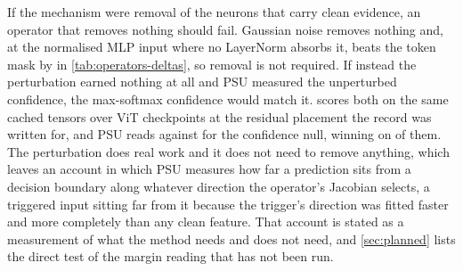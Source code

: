 \documentclass[../main.tex]{subfiles}
\begin{document}
If the mechanism were removal of the neurons that carry clean evidence, an operator that removes nothing should fail. Gaussian noise removes nothing and, at the normalised MLP input where no LayerNorm absorbs it, beats the token mask by \GaussianMinusTokenMaskMlp{} in \cref{tab:operators-deltas}, so removal is not required. If instead the perturbation earned nothing at all and PSU measured the unperturbed confidence, the max-softmax confidence would match it.  scores both on the same cached tensors over \ConfidenceNullCheckpoints{} ViT checkpoints at the residual placement the record was written for, and PSU reads \ConfidenceNullPsuAuroc{} against \ConfidenceNullAuroc{} for the confidence null, winning on \ConfidenceNullPsuWins{} of them. The perturbation does real work and it does not need to remove anything, which leaves an account in which PSU measures how far a prediction sits from a decision boundary along whatever direction the operator's Jacobian selects, a triggered input sitting far from it because the trigger's direction was fitted faster and more completely than any clean feature. That account is stated as a measurement of what the method needs and does not need, and \cref{sec:planned} lists the direct test of the margin reading that has not been run.


\end{document}
